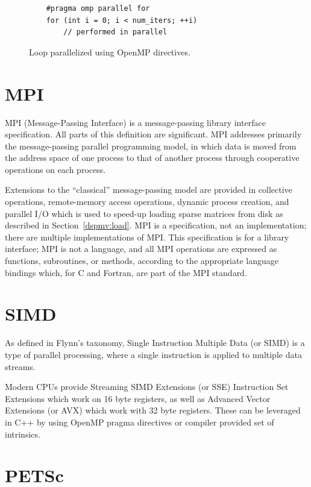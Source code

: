 \documentclass[thesis=M,english]{FITthesis}[2019/12/23]
\begin{document}
\begin{figure}[htp]
    \begin{verbatim}
    #pragma omp parallel for
    for (int i = 0; i < num_iters; ++i)
        // performed in parallel
    \end{verbatim}
    \caption{Loop parallelized using OpenMP directives.}
\end{figure}


\section{MPI}\label{tech:mpi}

MPI (Message-Passing Interface) is a message-passing library interface specification.
All parts of this definition are significant. MPI addresses primarily the message-passing parallel
programming model, in which data is moved from the address space of one process to
that of another process through cooperative operations on each process.

Extensions to the
“classical” message-passing model are provided in collective operations, remote-memory
access operations, dynamic process creation, and parallel I/O which is used to speed-up loading
sparse matrices from disk as described in Section~\ref{dspmv:load}. MPI is a specification, not
an implementation; there are multiple implementations of MPI. This specification is for a
library interface; MPI is not a language, and all MPI operations are expressed as functions,
subroutines, or methods, according to the appropriate language bindings which, for C and
Fortran, are part of the MPI standard.
\cite{mpi40}


\section{SIMD}\label{tech:simd}

As defined in Flynn's taxonomy, Single Instruction Multiple Data (or SIMD) is a type of parallel
processing, where a single instruction is applied to multiple data streams.

Modern CPUs provide Streaming SIMD Extensions (or SSE) Instruction Set Extensions which work on 16 byte
registers, as well as Advanced Vector Extensions (or AVX) which work with 32 byte registers.
These can be leveraged in C++ by using OpenMP pragma directives or compiler provided set of intrinsics.

\section{PETSc}\label{tech:petsc}
\end{document}
